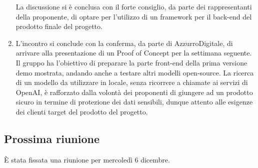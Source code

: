 \begin{enumerate}
    La discussione si è conclusa con il forte consiglio, da parte dei rappresentanti della proponente, di optare per l'utilizzo di un framework per il back-end del prodotto finale del progetto.
    \item L'incontro si conclude con la conferma, da parte di AzzurroDigitale, di arrivare alla presentazione di un Proof of Concept per la settimana seguente. Il gruppo ha l'obiettivo di preparare la parte front-end della prima versione demo mostrata, andando anche a testare altri modelli open-source. La ricerca di un modello da utilizzare in locale, senza ricorrere a chiamate ai servizi di OpenAI, è rafforzato dalla volontà dei proponenti di giungere ad un prodotto sicuro in termine di protezione dei dati sensibili, dunque attento alle esigenze dei clienti target del prodotto del progetto.
\end{enumerate}


\subsection{Prossima riunione} \label{subsec:riunione}
È stata fissata una riunione per mercoledì 6 dicembre.
